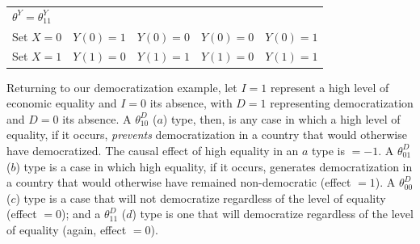 \documentclass[
  12pt,
]{book}
\begin{document}
\begin{longtable}[]{@{}lcccc@{}}
\begin{minipage}[t]{0.18\columnwidth}
\(\theta^Y=\theta^Y_{11}\)\strut
\end{minipage}\tabularnewline
\begin{minipage}[t]{0.10\columnwidth}\raggedright
Set \(X=0\)\strut
\end{minipage} & \begin{minipage}[t]{0.19\columnwidth}\centering
\(Y(0)=1\)\strut
\end{minipage} & \begin{minipage}[t]{0.21\columnwidth}\centering
\(Y(0)=0\)\strut
\end{minipage} & \begin{minipage}[t]{0.18\columnwidth}\centering
\(Y(0)=0\)\strut
\end{minipage} & \begin{minipage}[t]{0.18\columnwidth}\centering
\(Y(0)=1\)\strut
\end{minipage}\tabularnewline
\begin{minipage}[t]{0.10\columnwidth}\raggedright
Set \(X=1\)\strut
\end{minipage} & \begin{minipage}[t]{0.19\columnwidth}\centering
\(Y(1)=0\)\strut
\end{minipage} & \begin{minipage}[t]{0.21\columnwidth}\centering
\(Y(1)=1\)\strut
\end{minipage} & \begin{minipage}[t]{0.18\columnwidth}\centering
\(Y(1)=0\)\strut
\end{minipage} & \begin{minipage}[t]{0.18\columnwidth}\centering
\(Y(1)=1\)\strut
\end{minipage}\tabularnewline
\bottomrule
\end{longtable}

Returning to our democratization example, let \(I=1\) represent a high level of economic equality and \(I=0\) its absence, with \(D=1\) representing democratization and \(D=0\) its absence. A \(\theta^D_{10}\) (\(a\)) type, then, is any case in which a high level of equality, if it occurs, \emph{prevents} democratization in a country that would otherwise have democratized. The causal effect of high equality in an \(a\) type is \(= -1\). A \(\theta^D_{01}\) (\(b\)) type is a case in which high equality, if it occurs, generates democratization in a country that would otherwise have remained non-democratic (effect \(= 1\)). A \(\theta^D_{00}\) (\(c\)) type is a case that will not democratize regardless of the level of equality (effect \(= 0\)); and a \(\theta^D_{11}\) (\(d\)) type is one that will democratize regardless of the level of equality (again, effect \(= 0\)).
\end{document}
